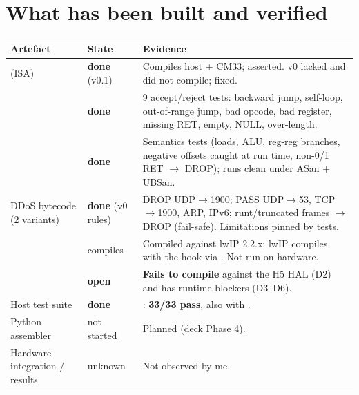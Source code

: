 \documentclass[10pt,a4paper]{article}
\newcommand{\done}{\textcolor{ok}{\textbf{done}}}
\newcommand{\open}{\textcolor{warn}{\textbf{open}}}
\begin{document}
\section{What has been built and verified}\label{sec:built}
\begin{tabularx}{\textwidth}{@{}P{4.4cm}P{2.1cm}L@{}}
\toprule
\textbf{Artefact} & \textbf{State} & \textbf{Evidence} \\
\midrule
{} (ISA) & \done{} (v0.1) & Compiles host + CM33;  asserted. v0 lacked  and did not compile; fixed. \\
 & \done{} & 9 accept/reject tests: backward jump, self-loop, out-of-range jump, bad opcode, bad register, missing RET, empty, NULL, over-length. \\
 & \done{} & Semantics tests (loads, ALU, reg-reg branches, negative offsets caught at run time, non-0/1 RET $\rightarrow$ DROP); runs clean under ASan + UBSan. \\
DDoS bytecode (2 variants) & \done{} (v0 rules) & DROP UDP$\rightarrow$1900; PASS UDP$\rightarrow$53, TCP$\rightarrow$1900, ARP, IPv6; runt/truncated frames $\rightarrow$ DROP (fail-safe). Limitations pinned by tests. \\
 & compiles & Compiled against lwIP 2.2.x; lwIP  compiles with the hook via . Not run on hardware. \\
 & \open{} & \textbf{Fails to compile} against the H5 HAL (D2) and has runtime blockers (D3--D6). \\
Host test suite & \done{} & : \textbf{33/33 pass}, also with . \\
Python assembler & not started & Planned (deck Phase 4). \\
Hardware integration / results & unknown & Not observed by me. \\
\bottomrule
\end{tabularx}
\end{document}
